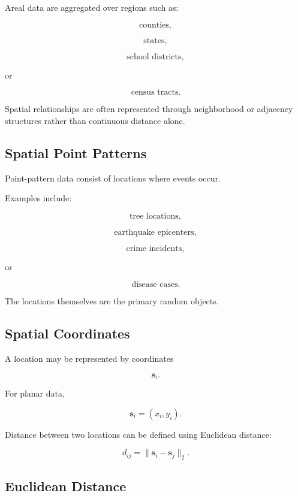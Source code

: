 Areal data are aggregated over regions such as:

\[
\boxed{
\text{counties},
}
\]

\[
\boxed{
\text{states},
}
\]

\[
\boxed{
\text{school districts},
}
\]

or

\[
\boxed{
\text{census tracts}.
}
\]

Spatial relationships are often represented through neighborhood or
adjacency structures rather than continuous distance alone.

\subsection{Spatial Point Patterns}
\label{subsec:spatial-point-patterns}

Point-pattern data consist of locations where events occur.

Examples include:

\[
\boxed{
\text{tree locations},
}
\]

\[
\boxed{
\text{earthquake epicenters},
}
\]

\[
\boxed{
\text{crime incidents},
}
\]

or

\[
\boxed{
\text{disease cases}.
}
\]

The locations themselves are the primary random objects.

\subsection{Spatial Coordinates}
\label{subsec:spatial-coordinates}

A location may be represented by coordinates

\[
\mathbf{s}_i.
\]

For planar data,

\[
\boxed{
\mathbf{s}_i
=
(x_i,y_i).
}
\]

Distance between two locations can be defined using Euclidean distance:

\[
\boxed{
d_{ij}
=
\|
\mathbf{s}_i-\mathbf{s}_j
\|_2.
}
\]

\subsection{Euclidean Distance}
\label{subsec:spatial-euclidean-distance}

